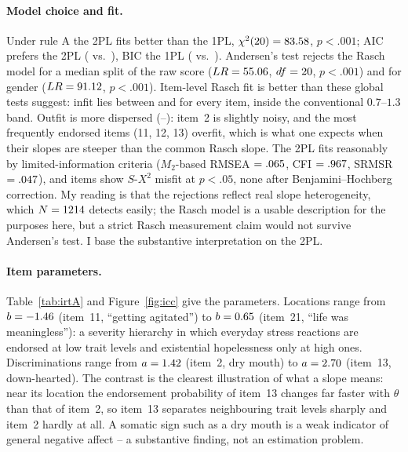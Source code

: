 \documentclass[11pt,a4paper]{article}
\newcommand{\itemno}[1]{item~#1}
\begin{document}
\paragraph{Model choice and fit.} Under rule A the 2PL fits better than the 1PL,
$\chi^2(20)=83.58$, $p<.001$; AIC prefers the 2PL (\AICtwoPLA{} vs.\ \AIConePLA), BIC the
1PL (\BIConePLA{} vs.\ \BICtwoPLA). Andersen's test rejects the Rasch model for a median
split of the raw score ($LR=55.06$, $df=20$, $p<.001$) and for gender
($LR=91.12$, $p<.001$). Item-level Rasch fit is better than these global
tests suggest: infit lies between \InfitMinA{} and \InfitMaxA{} for every item, inside
the conventional $0.7$--$1.3$ band. Outfit is more dispersed (\OutfitMinA--\OutfitMaxA):
\itemno{2} is slightly noisy, and the most frequently endorsed items (11, 12, 13) overfit,
which is what one expects when their slopes are steeper than the common Rasch slope.
The 2PL fits reasonably by limited-information criteria
($M_2$-based RMSEA $=.065$, CFI $=.967$, SRMSR $=.047$),
and \SXtwoMisfitA{} items show $S$-$X^2$ misfit at $p<.05$, none after
Benjamini--Hochberg correction. My reading is that the rejections reflect real slope
heterogeneity, which $N=1214$ detects easily; the Rasch model is a usable
description for the purposes here, but a strict Rasch measurement claim would not
survive Andersen's test. I base the substantive interpretation on the 2PL.

\paragraph{Item parameters.} Table~\ref{tab:irtA} and Figure~\ref{fig:icc} give the
parameters. Locations range from $b=-1.46$ (\itemno{11}, ``getting agitated'') to
$b=0.65$ (\itemno{21}, ``life was meaningless''): a severity hierarchy in which
everyday stress reactions are endorsed at low trait levels and existential hopelessness
only at high ones. Discriminations range from $a=1.42$ (\itemno{2}, dry mouth) to
$a=2.70$ (\itemno{13}, down-hearted). The contrast is the clearest illustration of what
a slope means: near its location the endorsement probability of \itemno{13} changes far
faster with $\theta$ than that of \itemno{2}, so \itemno{13} separates neighbouring trait
levels sharply and \itemno{2} hardly at all. A somatic sign such as a dry mouth is a weak
indicator of general negative affect -- a substantive finding, not an estimation problem.
\end{document}
